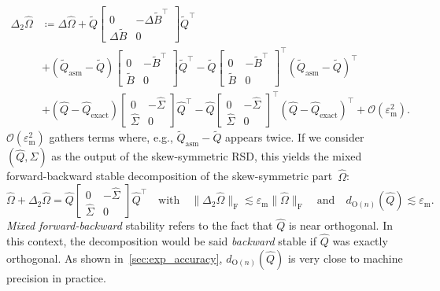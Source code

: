 \documentclass[10pt,twoside,dvipsnames]{siamart1116}
\numberwithin{algorithm}{section}
\numberwithin{equation}{section}
\begin{document}
		\begin{align*}
		\Delta_2\widehat{\Omega} &\coloneq \Delta\widehat{\Omega} + \widetilde{Q}\left[\begin{smallmatrix}
		0&-\Delta\widetilde{B}^\top \\
		\Delta\widetilde{B}&0
		\end{smallmatrix}\right]\widetilde{Q}^\top \\
		&+ (\widetilde{Q}_\mathrm{asm} -\widetilde{Q}) \left[\begin{smallmatrix}0&-\widetilde{B}^\top \\ \widetilde{B}&0 \end{smallmatrix}\right]\widetilde{Q}^\top - \widetilde{Q}  \left[\begin{smallmatrix} 0&-\widetilde{B}^\top \\ \widetilde{B}&0 \end{smallmatrix}\right]^\top(\widetilde{Q}_\mathrm{asm} - \widetilde{Q})^\top\\
		&+(\widehat{Q} -\widehat{Q}_{\mathrm{exact}}) \left[\begin{smallmatrix}
		0&-\widehat{\Sigma} \\
		\widehat{\Sigma}&0
		\end{smallmatrix}\right]\widehat{Q}^\top-\widehat{Q}\left[\begin{smallmatrix}
		0&-\widehat{\Sigma} \\
		\widehat{\Sigma}&0
		\end{smallmatrix}\right]^\top(\widehat{Q}-\widehat{Q}_{\mathrm{exact}})^\top +\mathcal{O}(\varepsilon_\mathrm{m}^2). 
		\end{align*}
$\mathcal{O}(\varepsilon_\mathrm{m}^2)$ gathers terms where, e.g., $\widetilde{Q}_\mathrm{asm} -\widetilde{Q}$ appears twice. If we consider $(\widehat{Q},\widehat{\Sigma})$ as the output of the skew-symmetric RSD, this yields the mixed forward-backward stable decomposition of the skew-symmetric part~$\widehat{\Omega}$:
	\begin{equation}\label{eq:stable_skew_EVP}
	\widehat{\Omega} + \Delta_2\widehat{\Omega} = \widehat{Q}\begin{bmatrix}
	0&-\widehat{\Sigma}\\
		\widehat{\Sigma}&0
	\end{bmatrix}\widehat{Q}^\top  \quad\text{with}\quad \|\Delta_2\widehat{\Omega}\|_\mathrm{F}\lesssim \varepsilon_\mathrm{m}\|\widehat{\Omega}\|_\mathrm{F}\quad\text{and}\quad d_{\mathrm{O}(n)}(\widehat{Q})\lesssim \varepsilon_\mathrm{m}.
	\end{equation}
\emph{Mixed forward-backward} stability refers to the fact that $\widehat{Q}$ is near orthogonal. In this context, the decomposition would be said \emph{backward} stable if $\widehat{Q}$ was exactly orthogonal. As shown in~\cref{sec:exp_accuracy}, $d_{\mathrm{O}(n)}(\widehat{Q})$ is very close to machine precision in practice.
\end{document}
